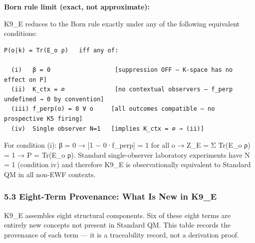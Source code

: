 \documentclass[
  11pt,
]{article}
\begin{document}
\textbf{Born rule limit (exact, not approximate):}

K9\_E reduces to the Born rule exactly under any of the following
equivalent conditions:

\begin{verbatim}
P(o|k) = Tr(E_o ρ)   iff any of:

  (i)   β = 0                  [suppression OFF — K-space has no effect on P]
  (ii)  K_ctx = ∅              [no contextual observers — f_perp undefined → 0 by convention]
  (iii) f_perp(o) = 0 ∀ o     [all outcomes compatible — no prospective K5 firing]
  (iv)  Single observer N=1   [implies K_ctx = ∅ → (ii)]
\end{verbatim}

For condition (i): β = 0 → {[}1 − 0·f\_perp{]} = 1 for all o → Z\_E = Σ
Tr(E\_o ρ) = 1 → P = Tr(E\_o ρ). Standard single-observer laboratory
experiments have N = 1 (condition iv) and therefore K9\_E is
observationally equivalent to Standard QM in all non-EWF contexts.

\subsubsection{5.3 Eight-Term Provenance: What Is New in
K9\_E}\label{eight-term-provenance-what-is-new-in-k9_e}

K9\_E assembles eight structural components. Six of these eight terms
are entirely new concepts not present in Standard QM. This table records
the provenance of each term --- it is a traceability record, not a
derivation proof.
\end{document}
